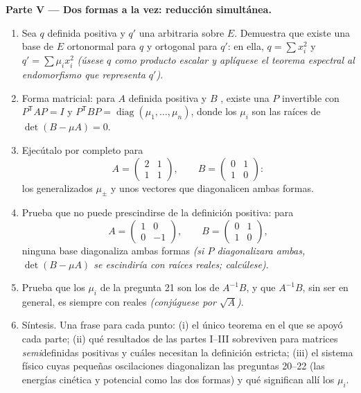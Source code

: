 \begin{problem}
\medskip
\noindent\textbf{Parte V --- Dos formas a la vez: reducción
simultánea.}
\begin{enumerate}[resume]
  \item Sea $q$ definida positiva y $q'$ una 
        arbitraria sobre $E$. Demuestra que existe una base de $E$
        ortonormal para $q$ y ortogonal para $q'$: en ella, $q =
        \sum x_i^2$ y $q' = \sum \mu_i x_i^2$ \emph{(úsese $q$ como
        producto escalar y aplíquese el teorema espectral al
        endomorfismo que representa $q'$)}.
  \item Forma matricial: para $A$ definida positiva y $B$
        , existe una $P$ invertible con $P^{\mathsf T}AP =
        I$ y $P^{\mathsf T}BP = \operatorname{diag}(\mu_1, \dots,
        \mu_n)$, donde los $\mu_i$ son las raíces de $\det(B - \mu
        A) = 0$.
  \item Ejecútalo por completo para
        \[
        A = \begin{pmatrix} 2 & 1\\ 1 & 1 \end{pmatrix},
        \qquad
        B = \begin{pmatrix} 0 & 1\\ 1 & 0 \end{pmatrix} :
        \]
        los  generalizados $\mu_\pm$ y unos vectores
        que diagonalicen ambas formas.
  \item Prueba que no puede prescindirse de la definición positiva:
        para
        \[
        A = \begin{pmatrix} 1 & 0\\ 0 & -1 \end{pmatrix},
        \qquad
        B = \begin{pmatrix} 0 & 1\\ 1 & 0 \end{pmatrix},
        \]
        ninguna base diagonaliza ambas formas \emph{(si $P$
        diagonalizara ambas, $\det(B - \mu A)$ se escindiría con
        raíces reales; calcúlese)}.
  \item Prueba que los $\mu_i$ de la pregunta 21 son los
         de $A^{-1}B$, y que $A^{-1}B$, sin ser
         en general, es siempre  con
         reales \emph{(conjúguese por $\sqrt A$)}.
  \item Síntesis. Una frase para cada punto: (i) el único teorema en
        el que se apoyó cada parte; (ii) qué resultados de las
        partes I--III sobreviven para matrices
        \emph{semi}definidas positivas y cuáles necesitan la
        definición estricta; (iii) el sistema físico cuyas pequeñas
        oscilaciones diagonalizan las preguntas 20--22 (las energías
        cinética y potencial como las dos formas) y qué significan
        allí los $\mu_i$.
\end{enumerate}
\end{problem}

